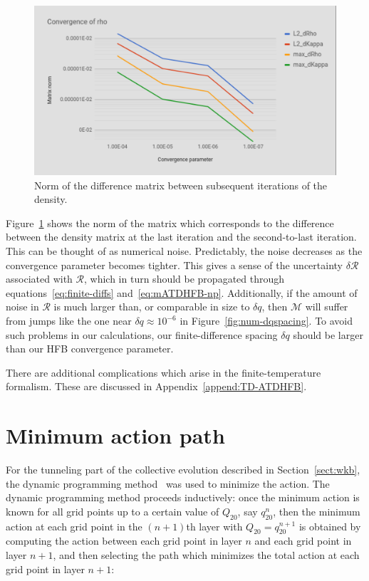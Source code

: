 \begin{figure}
	\centering
	\includegraphics[width=0.7\linewidth]{TeX_files/Num-rho_conv}
	\caption[Norm of the difference matrix between subsequent iterations of the density]{Norm of the difference matrix between subsequent iterations of the density.}
	\label{fig:num-rhoconv}
\end{figure}

Figure~\ref{fig:num-rhoconv} shows the norm of the matrix which corresponds to the difference between the density matrix at the last iteration and the second-to-last iteration. This can be thought of as numerical noise. Predictably, the noise decreases as the convergence parameter becomes tighter. This gives a sense of the uncertainty $\delta \mathcal{R}$ associated with $\mathcal{R}$, which in turn should be propagated through equations~\eqref{eq:finite-diffs} and~\eqref{eq:mATDHFB-np}. Additionally, if the amount of noise in $\mathcal{R}$ is much larger than, or comparable in size to $\delta q$, then $\mathcal{M}$ will suffer from jumps like the one near $\delta q \approx 10^{-6}$ in Figure~\ref{fig:num-dqspacing}. To avoid such problems in our calculations, our finite-difference spacing $\delta q$ should be larger than our HFB convergence parameter.

There are additional complications which arise in the finite-temperature formalism. These are discussed in Appendix~\ref{append:TD-ATDHFB}.

\section{Minimum action path}
For the tunneling part of the collective evolution described in Section~\ref{sect:wkb}, the dynamic programming method~\cite{Baran1981} was used to minimize the action. The dynamic programming method proceeds inductively: once the minimum action is known for all grid points up to a certain value of $Q_{20}$, say $q_{20}^n$, then the minimum action at each grid point in the $(n+1)$th layer with $Q_{20}=q_{20}^{n+1}$ is obtained by computing the action between each grid point in layer $n$ and each grid point in layer $n+1$, and then selecting the path which minimizes the total action at each grid point in layer $n+1$:

